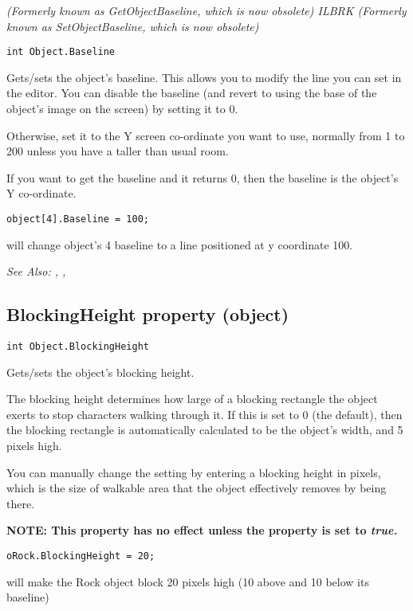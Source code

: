 \it{(Formerly known as GetObjectBaseline, which is now obsolete)} ILBRK
\it{(Formerly known as SetObjectBaseline, which is now obsolete)}

\begin{verbatim}
int Object.Baseline
\end{verbatim}
Gets/sets the object's baseline. This allows you to modify the line you can
set in the editor. You can disable the baseline (and revert to using the
base of the object's image on the screen) by setting it to 0.

Otherwise, set it to the Y screen co-ordinate you want to use,
normally from 1 to 200 unless you have a taller than usual room.

If you want to get the baseline and it returns 0, then the baseline is the
object's Y co-ordinate.

\begin{verbatim}
object[4].Baseline = 100;
\end{verbatim}
will change object's 4 baseline to a line positioned at y coordinate 100.

\it{See Also:} ,
,


\subsection{BlockingHeight property (object)}\label{Object.BlockingHeight}%

\begin{verbatim}
int Object.BlockingHeight
\end{verbatim}
Gets/sets the object's blocking height.

The blocking height determines how large of a blocking rectangle the object exerts to
stop characters walking through it. If this is set to 0 (the default), then the
blocking rectangle is automatically calculated to be the object's width, and 5 pixels
high.

You can manually change the setting by entering a blocking height in pixels, which is the
size of walkable area that the object effectively removes by being there.

\bf{NOTE:} This property has no effect unless the  property
is set to \it{true}.

\begin{verbatim}
oRock.BlockingHeight = 20;
\end{verbatim}
will make the Rock object block 20 pixels high (10 above and 10 below its baseline)

